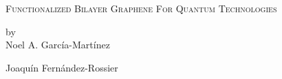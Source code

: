 \begin{titlepage}

\begin{center}

\begingroup \linespread{1,75} \selectfont
\textsc{\LARGE Functionalized Bilayer Graphene For Quantum Technologies}\\[1,5cm]
\endgroup


by\\[0,5cm]
Noel A. García-Martínez\\[2,5cm]


\end{center}

Joaquín Fernández-Rossier

\vfill

\end{titlepage}
